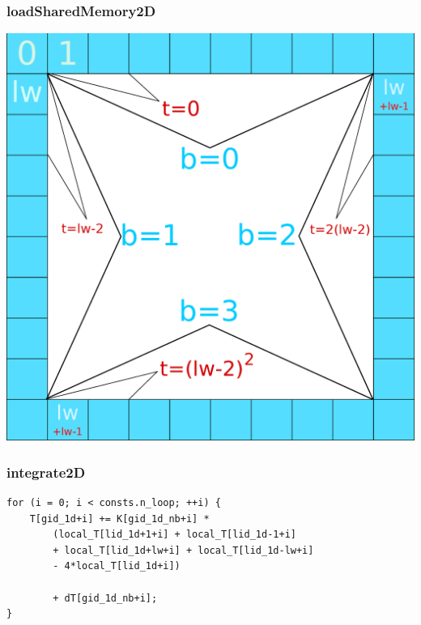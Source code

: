 \begin{frame}[fragile]
\frametitle{loadSharedMemory2D}
\begin{center}
\includegraphics[scale=0.28]{images/borders.eps}
\end{center}
\end{frame}

\begin{frame}[fragile]
\frametitle{integrate2D}
\begin{lstlisting}
for (i = 0; i < consts.n_loop; ++i) {
	T[gid_1d+i] += K[gid_1d_nb+i] *
		(local_T[lid_1d+1+i] + local_T[lid_1d-1+i] 
		+ local_T[lid_1d+lw+i] + local_T[lid_1d-lw+i] 
		- 4*local_T[lid_1d+i])
		
		+ dT[gid_1d_nb+i];
}
\end{lstlisting}
\end{frame}


